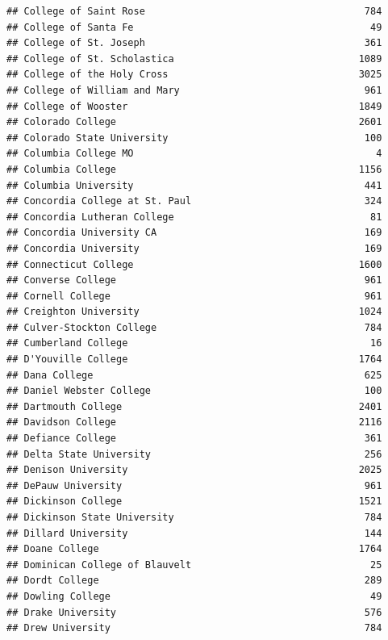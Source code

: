 \documentclass[
]{article}
\begin{document}
\begin{verbatim}
## College of Saint Rose                                      784
## College of Santa Fe                                         49
## College of St. Joseph                                      361
## College of St. Scholastica                                1089
## College of the Holy Cross                                 3025
## College of William and Mary                                961
## College of Wooster                                        1849
## Colorado College                                          2601
## Colorado State University                                  100
## Columbia College MO                                          4
## Columbia College                                          1156
## Columbia University                                        441
## Concordia College at St. Paul                              324
## Concordia Lutheran College                                  81
## Concordia University CA                                    169
## Concordia University                                       169
## Connecticut College                                       1600
## Converse College                                           961
## Cornell College                                            961
## Creighton University                                      1024
## Culver-Stockton College                                    784
## Cumberland College                                          16
## D'Youville College                                        1764
## Dana College                                               625
## Daniel Webster College                                     100
## Dartmouth College                                         2401
## Davidson College                                          2116
## Defiance College                                           361
## Delta State University                                     256
## Denison University                                        2025
## DePauw University                                          961
## Dickinson College                                         1521
## Dickinson State University                                 784
## Dillard University                                         144
## Doane College                                             1764
## Dominican College of Blauvelt                               25
## Dordt College                                              289
## Dowling College                                             49
## Drake University                                           576
## Drew University                                            784

\end{verbatim}
\end{document}
